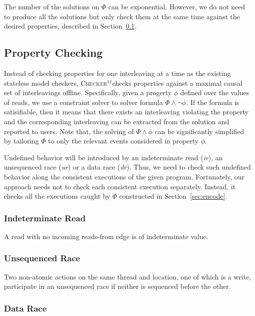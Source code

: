 \documentclass[preprint, numbers, 10pt]{sigplanconf}
\newcommand{\checker}{\textsc{Checker$^{11}$}}
\begin{document}
The number of the solutions on $\Phi$ can be exponential. However, we do not need to
produce all the solutions but only check them at the same time against the desired properties,
described in Section~\ref{sec:check}. 

\subsection{Property Checking}
\label{sec:check}

Instead of checking properties for one interleaving at a time as the existing stateless
model checkers, \checker checks properties against a maximal causal set of 
interleavings offline. Specifically, given a progerty $\phi$ defined over the values of reads, we 
use a constraint solver to solver formula $\Phi\wedge\neg\phi$. If the formula is satisifiable, then
it means that there exists an interleaving violating the property and the corresponding interleaving
can be extracted from the solution and reported to users. Note that, the solving of $\Phi\wedge\phi$
can be significantly simplified by tailoring $\Phi$ to only the relevant events considered in property $\phi$.

Undefined behavior will be introduced by an indeterminate read (\textit{ir}), 
an unsequenced race (\textit{ur}) or a data race (\textit{dr}). Thus, 
we need to check such undefined behavior along the consistent executions
of the given program. Fortunately, our approach needs not to check each
consistent execution separately. Instead, it checks all the executions caught
by $\Phi$ constructed in Section~\ref{sec:encode}. 

\subsubsection{Indeterminate Read}

A read with no incoming reads-from edge is of indeterminate value. 

\subsubsection{Unsequenced Race}

Two non-atomic actions on the same thread and location, one of which is 
a write, participate in an unsequenced race if neither is sequenced before the other.

\subsubsection{Data Race}
\end{document}
